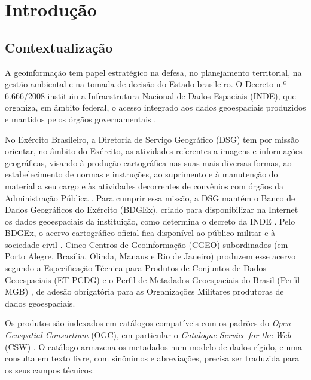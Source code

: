 \chapter{Introdução}

\section{Contextualização}

A geoinformação tem papel estratégico na defesa, no planejamento territorial, na gestão ambiental e na tomada de decisão do Estado brasileiro. O Decreto n.º 6.666/2008 instituiu a Infraestrutura Nacional de Dados Espaciais (INDE), que organiza, em âmbito federal, o acesso integrado aos dados geoespaciais produzidos e mantidos pelos órgãos governamentais \cite{inde2010decreto}.

No Exército Brasileiro, a Diretoria de Serviço Geográfico (DSG) tem por missão orientar, no âmbito do Exército, as atividades referentes a imagens e informações geográficas, visando à produção cartográfica nas suas mais diversas formas, ao estabelecimento de normas e instruções, ao suprimento e à manutenção do material a seu cargo e às atividades decorrentes de convênios com órgãos da Administração Pública \cite{dsg2024missao}. Para cumprir essa missão, a DSG mantém o Banco de Dados Geográficos do Exército (BDGEx), criado para disponibilizar na Internet os dados geoespaciais da instituição, como determina o decreto da INDE \cite{xavier2014bdgex}. Pelo BDGEx, o acervo cartográfico oficial fica disponível ao público militar e à sociedade civil \cite{bdgex2024}. Cinco Centros de Geoinformação (CGEO) subordinados (em Porto Alegre, Brasília, Olinda, Manaus e Rio de Janeiro) produzem esse acervo segundo a Especificação Técnica para Produtos de Conjuntos de Dados Geoespaciais (ET-PCDG) \cite{etpcdg2016} e o Perfil de Metadados Geoespaciais do Brasil (Perfil MGB) \cite{perfilmgb2009}, de adesão obrigatória para as Organizações Militares produtoras de dados geoespaciais.

Os produtos são indexados em catálogos compatíveis com os padrões do \textit{Open Geospatial Consortium} (OGC), em particular o \textit{Catalogue Service for the Web} (CSW) \cite{ogccsw2007}. O catálogo armazena os metadados num modelo de dados rígido, e uma consulta em texto livre, com sinônimos e abreviações, precisa ser traduzida para os seus campos técnicos.

